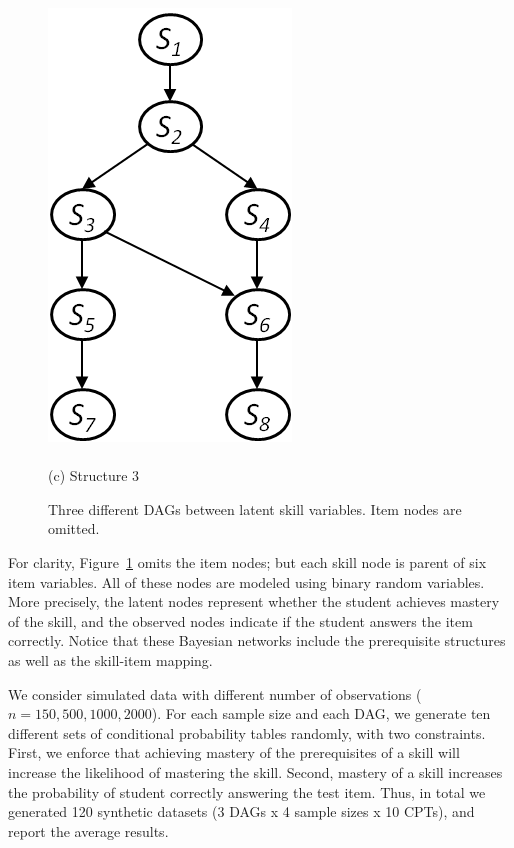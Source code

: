 \documentclass{edm_template}
\begin{document}
{\begin{figure}
\begin{minipage}[b]{0.45\linewidth}
			\includegraphics[width=0.7\linewidth]{figures/model3.png}\\~\\
			(c) Structure 3
		\end{minipage}	
		\caption{Three different DAGs between latent skill variables.  Item nodes are omitted.}
		\label{fig:syn-nets}
	\end{figure} 
	
	For clarity, Figure~\ref{fig:syn-nets}  omits the item nodes;
	but each skill node is parent of six item variables.
	All of these nodes are modeled using binary random variables.
	More precisely, the latent  nodes represent whether the student  achieves mastery of the skill,
	and the observed nodes indicate if the student answers the item correctly.
	Notice that these Bayesian networks include the prerequisite structures as well as the skill-item mapping.
	
	We consider simulated data with different number of observations ($n=150, 500, 1000, 2000$).
	For each sample size and each  DAG, we generate ten different sets of conditional probability tables
	randomly, with two  constraints.
	First, we enforce that achieving mastery of the prerequisites of a skill will increase the likelihood of mastering the skill.
	Second, mastery of a skill increases the probability of student correctly answering the test item. 
	Thus, in total we generated 120 synthetic datasets (3 DAGs x 4 sample sizes x 10 CPTs), and  report the average results.
	
}
\end{document}
